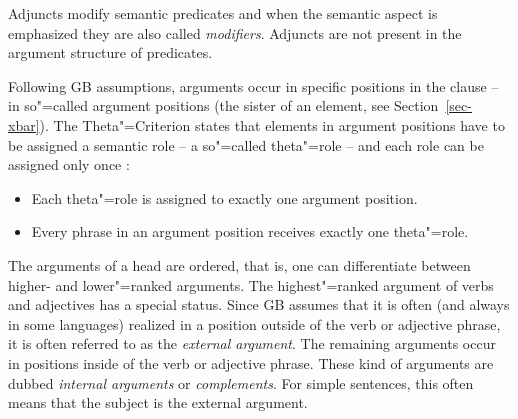 Adjuncts modify semantic predicates and when the semantic aspect is emphasized they are
also called \emph{modifiers}. Adjuncts are not present in the argument structure
of predicates.

Following GB assumptions, arguments occur in specific positions in the clause -- in so"=called argument positions (\eg the sister of 
an \xnull element, see Section~\ref{sec-xbar}). The Theta"=Criterion states that elements in argument positions have to be assigned
a semantic role -- a so"=called theta"=role -- and
each role can be assigned only once \citep[]{Chomsky81a}:
\begin{principle-break}[Theta"=Criterion]\label{theta-Kriterium}
\begin{itemize}
\item Each theta"=role is assigned to exactly one argument position.
\item Every phrase in an argument position receives exactly one theta"=role.
\end{itemize}
\end{principle-break}
\noindent
The arguments of a head are ordered, that is, one can differentiate between higher- and lower"=ranked arguments. The highest"=ranked
argument of verbs and adjectives has a special status. Since GB assumes that it is often (and always in some languages) realized in a position
outside of the verb or adjective phrase, it is often referred to as the \emph{external argument}. The remaining
arguments occur in positions inside of the verb or adjective phrase. These kind of arguments are dubbed 
\emph{internal arguments} or \emph{complements}. For simple sentences, this often means that the subject
is the external argument.

